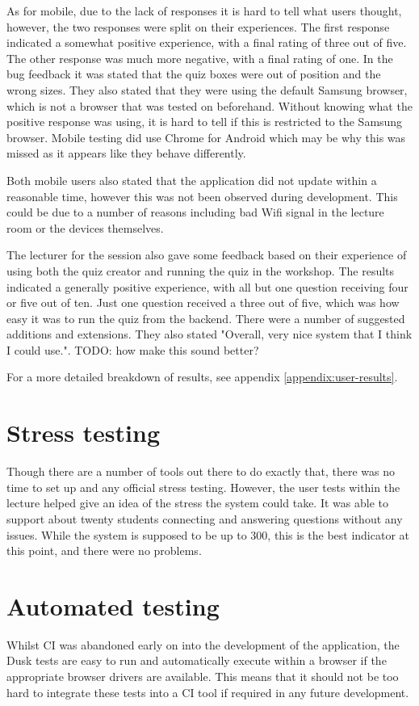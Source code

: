 As for mobile, due to the lack of responses it is hard to tell what users thought, however, the two responses were split on their experiences. The first response indicated a somewhat positive experience, with a final rating of three out of five. The other response was much more negative, with a final rating of one. In the bug feedback it was stated that the quiz boxes were out of position and the wrong sizes. They also stated that they were using the default Samsung browser, which is not a browser that was tested on beforehand. Without knowing what the positive response was using, it is hard to tell if this is restricted to the Samsung browser. Mobile testing did use Chrome for Android which may be why this was missed as it appears like they behave differently.

Both mobile users also stated that the application did not update within a reasonable time, however this was not been observed during development. This could be due to a number of reasons including bad Wifi signal in the lecture room or the devices themselves.

The lecturer for the session also gave some feedback based on their experience of using both the quiz creator and running the quiz in the workshop. The results indicated a generally positive experience, with all but one question receiving four or five out of ten. Just one question received a three out of five, which was how easy it was to run the quiz from the backend. There were a number of suggested additions and extensions. They also stated "Overall, very nice system that I think I could use.". TODO: how make this sound better?

For a more detailed breakdown of results, see appendix \ref{appendix:user-results}.

\section{Stress testing}
Though there are a number of tools out there to do exactly that, there was no time to set up and any official stress testing. However, the user tests within the lecture helped give an idea of the stress the system could take. It was able to support about twenty students connecting and answering questions without any issues. While the system is supposed to be up to 300, this is the best indicator at this point, and there were no problems.

\section{Automated testing}
Whilst CI was abandoned early on into the development of the application, the Dusk tests are easy to run and automatically execute within a browser if the appropriate browser drivers are available. This means that it should not be too hard to integrate these tests into a CI tool if required in any future development.